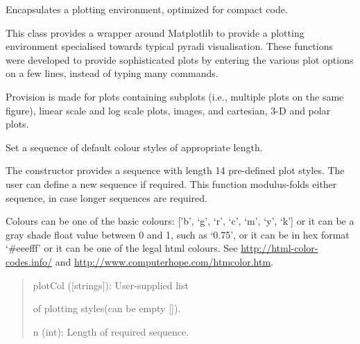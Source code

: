 \documentclass[a4paper,10pt,english]{sphinxmanual}
\begin{document}
\begin{fulllineitems}
\label{ryplot:pyradi.ryplot.Plotter}
Encapsulates a plotting environment, optimized for compact code.

This class provides a wrapper around Matplotlib to provide a plotting
environment specialised towards typical pyradi visualisation.  
These functions were developed to provide sophisticated plots by entering 
the various plot options on a few lines, instead of typing many commands.

Provision is made for plots containing subplots (i.e., multiple plots on 
the same figure), linear scale and log scale plots, images, and cartesian,
3-D and polar plots.

\begin{fulllineitems}
\label{ryplot:pyradi.ryplot.Plotter.buildPlotCol}
Set a sequence of default colour styles of
appropriate length.

The constructor provides a sequence with length
14 pre-defined plot styles.
The user can define a new sequence if required.
This function modulus-folds either sequence, in
case longer sequences are required.

Colours can be one of the basic colours:  
{[}'b', `g', `r', `c', `m', `y', `k'{]}   
or it can be a gray shade float value between 0 and 1,
such as `0.75', or it can be in hex format `\#eeefff'
or it can be one of the legal html colours.
See \href{http://html-color-codes.info/}{http://html-color-codes.info/} and 
\href{http://www.computerhope.com/htmcolor.htm}{http://www.computerhope.com/htmcolor.htm}.
\begin{quote}
\begin{description}
\item[{Args:}] \leavevmode
\begin{DUlineblock}{0em}
\item[] plotCol ({[}strings{]}): User-supplied list
\item[]
\begin{DUlineblock}{\DUlineblockindent}
\item[] of plotting styles(can be empty {[}{]}).
\end{DUlineblock}
\item[] n (int): Length of required sequence.
\end{DUlineblock}


\end{description}
\end{quote}
\end{fulllineitems}
\end{fulllineitems}
\end{document}

